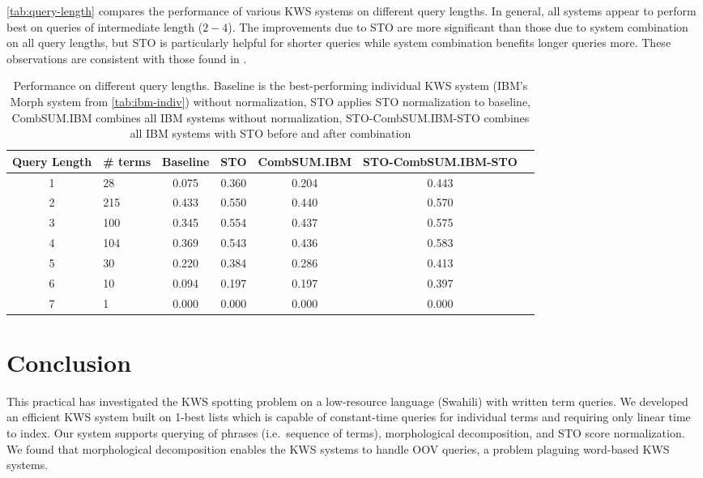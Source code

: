 \documentclass[a4paper,oneside,reqno]{amsart}
\begin{document}
\autoref{tab:query-length} compares the performance of various KWS systems on
different query lengths. In general, all systems appear to perform best on
queries of intermediate length ($2-4$). The improvements due to STO are more
significant than those due to system combination on all query lengths, but STO
is particularly helpful for shorter queries while system combination benefits
longer queries more. These observations are consistent with those found in
\cite{mamou2013system}.

\begin{table}[ht!]
  \begin{tabular}{clccccc}
    \toprule
    Query Length & \# terms & Baseline & STO & CombSUM.IBM & STO-CombSUM.IBM-STO \\ %
    \midrule
    1 & 28  & 0.075 & 0.360 & 0.204 & 0.443 \\
    2 & 215 & 0.433 & 0.550 & 0.440 & 0.570 \\
    3 & 100 & 0.345 & 0.554 & 0.437 & 0.575 \\
    4 & 104 & 0.369 & 0.543 & 0.436 & 0.583 \\
    5 & 30  & 0.220 & 0.384 & 0.286 & 0.413 \\
    6 & 10  & 0.094 & 0.197 & 0.197 & 0.397 \\
    7 & 1   & 0.000 & 0.000 & 0.000 & 0.000 \\
    \bottomrule
  \end{tabular}
  \caption{Performance on different query lengths. Baseline is the
  best-performing individual KWS system (IBM's Morph system from
  \autoref{tab:ibm-indiv}) without normalization,  STO applies STO
  normalization to baseline, CombSUM.IBM combines all IBM systems without
  normalization, STO-CombSUM.IBM-STO combines all IBM systems with STO before
  and after combination}
  \label{tab:query-length}
\end{table}

\section{Conclusion}

This practical has investigated the KWS spotting problem on a low-resource
language (Swahili) with written term queries. We developed an efficient KWS
system built on 1-best lists which is capable of constant-time queries for
individual terms and requiring only linear time to index. Our system supports
querying of phrases (i.e.\ sequence of terms), morphological
decomposition\cite{narasimhan2014morphological}, and STO score normalization.
We found that morphological decomposition enables the KWS systems to handle OOV
queries, a problem plaguing word-based KWS systems.
\end{document}

